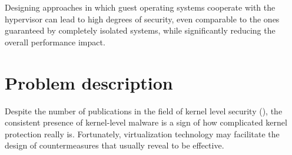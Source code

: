 Designing approaches in which guest operating systems cooperate with the hypervisor can lead to high degrees of security, even comparable to the ones guaranteed by completely isolated systems, while significantly reducing the overall performance impact.


\section{Problem description}
Despite the number of publications in the field of kernel level security (\cite{rootkitdetection, rootkitdetection2, HookSafe}), the consistent presence of kernel-level malware is a sign of how complicated kernel protection really is. 
Fortunately, virtualization technology may facilitate the design of countermeasures that usually reveal to be effective. 

